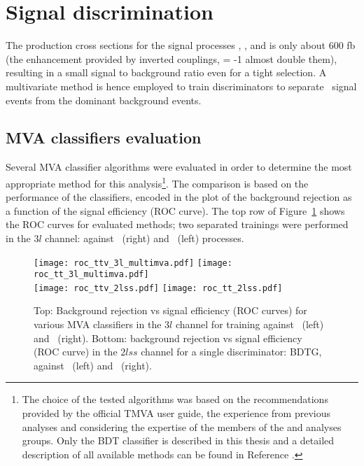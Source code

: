 \section{Signal discrimination }
\label{secc:signal_disc}

The production cross sections for the signal processes \tHq, \tHW, and \ttH is only about 600 fb (the enhancement provided by inverted couplings, \Ct = -1 almost double them), resulting in a small signal to background ratio even for a tight selection. A multivariate method is hence employed to train discriminators to separate \tH\ signal events from the dominant background events.

\subsection{MVA classifiers evaluation}

Several MVA classifier algorithms were evaluated in order to determine the most appropriate method for this analysis\footnote{The choice of the tested algorithms was based on the recommendations provided by the official TMVA user guide, the experience from previous analyses and considering the expertise of the members of the \tHq and \ttH analyses groups. Only the BDT classifier is described in this thesis and a detailed description of all available methods can be found in Reference \cite{tmva}.}. The comparison is based on the performance of the classifiers, encoded in the plot of the background rejection as a function of the signal efficiency (ROC curve). The top row of Figure~\ref{roc} shows the ROC curves for evaluated methods; two separated trainings were performed in the $3l$ channel: against \ttbar\ (right) and \ttV\ (left) processes.

\begin{figure} [!h]
  \centering
   \texttt{[image: roc\_ttv\_3l\_multimva.pdf]}
   \texttt{[image: roc\_tt\_3l\_multimva.pdf]} \\
   \texttt{[image: roc\_ttv\_2lss.pdf]}
   \texttt{[image: roc\_tt\_2lss.pdf]} 

\caption[MVA classifiers performance.]{ Top: Background rejection vs signal efficiency (ROC curves) for various MVA classifiers in the $3l$ channel for training against \ttV\ (left) and \ttbar\ (right). Bottom: background rejection vs signal efficiency (ROC curve) in the $2lss$ channel for a single discriminator: BDTG, against \ttV\ (left) and \ttbar\ (right).}
\label{roc}
\end{figure} 

